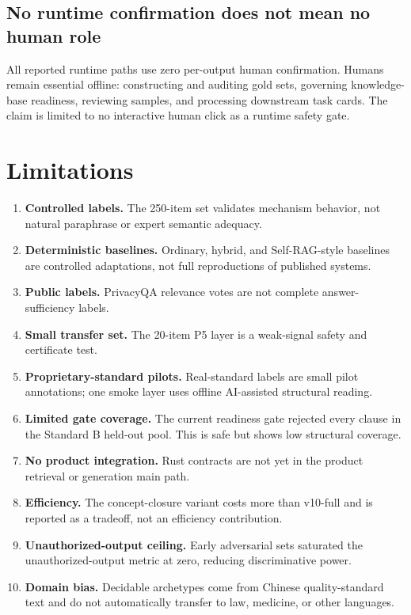 \documentclass[11pt]{article}
\begin{document}
\subsection{No runtime confirmation does not mean no human role}

All reported runtime paths use zero per-output human confirmation. Humans remain essential offline: constructing and auditing gold sets, governing knowledge-base readiness, reviewing samples, and processing downstream task cards. The claim is limited to no interactive human click as a runtime safety gate.

\section{Limitations}
\label{sec:limitations}

\begin{enumerate}[leftmargin=*]
  \item \textbf{Controlled labels.} The 250-item set validates mechanism behavior, not natural paraphrase or expert semantic adequacy.
  \item \textbf{Deterministic baselines.} Ordinary, hybrid, and Self-RAG-style baselines are controlled adaptations, not full reproductions of published systems.
  \item \textbf{Public labels.} PrivacyQA relevance votes are not complete answer-sufficiency labels.
  \item \textbf{Small transfer set.} The 20-item P5 layer is a weak-signal safety and certificate test.
  \item \textbf{Proprietary-standard pilots.} Real-standard labels are small pilot annotations; one smoke layer uses offline AI-assisted structural reading.
  \item \textbf{Limited gate coverage.} The current readiness gate rejected every clause in the Standard B held-out pool. This is safe but shows low structural coverage.
  \item \textbf{No product integration.} Rust contracts are not yet in the product retrieval or generation main path.
  \item \textbf{Efficiency.} The concept-closure variant costs more than v10-full and is reported as a tradeoff, not an efficiency contribution.
  \item \textbf{Unauthorized-output ceiling.} Early adversarial sets saturated the unauthorized-output metric at zero, reducing discriminative power.
  \item \textbf{Domain bias.} Decidable archetypes come from Chinese quality-standard text and do not automatically transfer to law, medicine, or other languages.
\end{enumerate}
\end{document}
